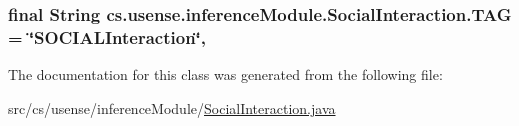 \subsubsection[{T\+A\+G}]{\setlength{\rightskip}{0pt plus 5cm}final String cs.\+usense.\+inference\+Module.\+Social\+Interaction.\+T\+A\+G = \char`\"{}S\+O\+C\+I\+A\+L\+Interaction\char`\"{}\hspace{0.3cm}{\ttfamily [static]}, {\ttfamily [private]}}\label{classcs_1_1usense_1_1inference_module_1_1_social_interaction_a20e5c3ed4759d13c153406d2145d11b5}


The documentation for this class was generated from the following file\+:\begin{DoxyCompactItemize}
\item 
src/cs/usense/inference\+Module/\hyperlink{_social_interaction_8java}{Social\+Interaction.\+java}\end{DoxyCompactItemize}
